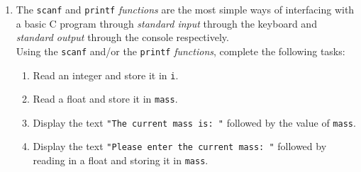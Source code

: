 \documentclass{pass}
\begin{document}
\begin{enumerate}[resume]
\item The \texttt{scanf} and \texttt{printf} \textit{functions} are the most simple ways of interfacing with a basic C program through \textit{standard input} through the keyboard and \textit{standard output} through the console respectively.\\
Using the \texttt{scanf} and/or the \texttt{printf} \textit{functions}, complete the following tasks:
	\begin{enumerate}
		\item Read an integer and store it in \texttt{i}.\\
		\item Read a float and store it in \texttt{mass}.\\
		\item Display the text \texttt{"The current mass is: "} followed by the value of \texttt{mass}.\\
		\item Display the text \texttt{"Please enter the current mass: "} followed by reading in a float and storing it in \texttt{mass}.\\
	\end{enumerate}
\end{enumerate}
\end{document}
